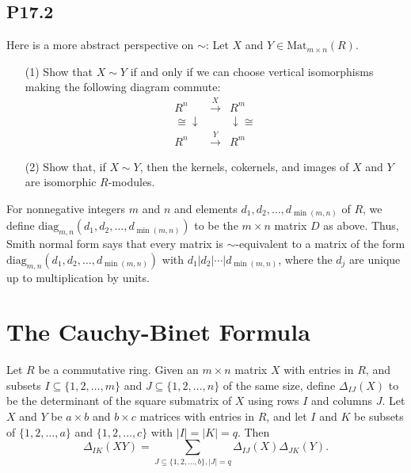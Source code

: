 \documentclass[lang=cn,11pt]{template}
\begin{document}
\subsection*{P17.2}
Here is a more abstract perspective on \( \sim \): Let \( X \) and \( Y \in \text{Mat}_{m \times n}(R) \).
\begin{itemize}
    \item[(1)] Show that \( X \sim Y \) if and only if we can choose vertical isomorphisms making the following diagram commute:
    \[
    \begin{array}{ccc}
        R^n & \xrightarrow{X} & R^m \\
        \cong \downarrow & & \downarrow \cong \\
        R^n & \xrightarrow{Y} & R^m
    \end{array}
    \]
    \item[(2)] Show that, if \( X \sim Y \), then the kernels, cokernels, and images of \( X \) and \( Y \) are isomorphic \( R \)-modules.
\end{itemize}

For nonnegative integers \( m \) and \( n \) and elements \( d_1, d_2, \ldots, d_{\min(m,n)} \) of \( R \), we define \( \text{diag}_{m,n}(d_1, d_2, \ldots, d_{\min(m,n)}) \) to be the \( m \times n \) matrix \( D \) as above. Thus, Smith normal form says that every matrix is \( \sim \)-equivalent to a matrix of the form \( \text{diag}_{m,n}(d_1, d_2, \ldots, d_{\min(m,n)}) \) with \( d_1 | d_2 | \cdots | d_{\min(m,n)} \), where the \( d_j \) are unique up to multiplication by units.

\section{The Cauchy-Binet Formula}

\begin{theorem}
Let \( R \) be a commutative ring. Given an \( m \times n \) matrix \( X \) with entries in \( R \), and subsets \( I \subseteq \{1, 2, \ldots, m\} \) and \( J \subseteq \{1, 2, \ldots, n\} \) of the same size, define \( \Delta_{IJ}(X) \) to be the determinant of the square submatrix of \( X \) using rows \( I \) and columns \( J \). Let \( X \) and \( Y \) be \( a \times b \) and \( b \times c \) matrices with entries in \( R \), and let \( I \) and \( K \) be subsets of \( \{1, 2, \ldots, a\} \) and \( \{1, 2, \ldots, c\} \) with \( |I| = |K| = q \). Then
\[
\Delta_{IK}(XY) = \sum_{J \subseteq \{1,2,\ldots,b\}, |J|=q} \Delta_{IJ}(X) \Delta_{JK}(Y).
\]
\end{theorem}
\end{document}
